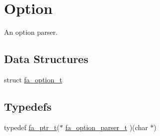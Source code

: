 \hypertarget{group___fa_option}{\section{Option}
\label{group___fa_option}
}


An option parser.  


\subsection*{Data Structures}
\begin{DoxyCompactItemize}
\item 
struct \hyperlink{structfa__option__t}{fa\-\_\-option\-\_\-t}
\end{DoxyCompactItemize}
\subsection*{Typedefs}
\begin{DoxyCompactItemize}
\item 
typedef \hyperlink{group___fa_ga915ddeae99ad7568b273d2b876425197}{fa\-\_\-ptr\-\_\-t}($\ast$ \hyperlink{group___fa_option_ga86aa8e13dfaaa7e6870855b204cfe3a0}{fa\-\_\-option\-\_\-parser\-\_\-t} )(char $\ast$)
\end{DoxyCompactItemize}
